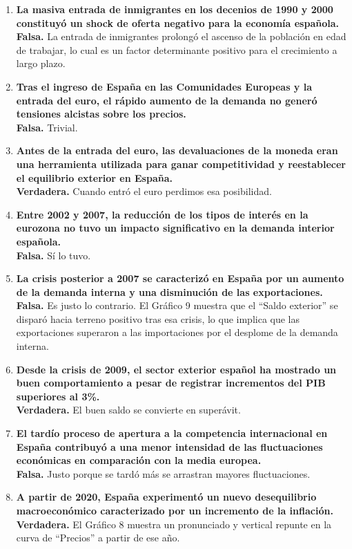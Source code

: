 \begin{enumerate}[label=\arabic*., resume=preguntas]
    \item \textbf{La masiva entrada de inmigrantes en los decenios de 1990 y 2000 constituyó un shock de oferta negativo para la economía española.} \\
    \textbf{Falsa.} La entrada de inmigrantes prolongó el ascenso de la población en edad de trabajar, lo cual es un factor determinante positivo para el crecimiento a largo plazo.

    \item \textbf{Tras el ingreso de España en las Comunidades Europeas y la entrada del euro, el rápido aumento de la demanda no generó tensiones alcistas sobre los precios.} \\
    \textbf{Falsa.} Trivial.

    \item \textbf{Antes de la entrada del euro, las devaluaciones de la moneda eran una herramienta utilizada para ganar competitividad y reestablecer el equilibrio exterior en España.} \\
    \textbf{Verdadera.} Cuando entró el euro perdimos esa posibilidad.

    \item \textbf{Entre 2002 y 2007, la reducción de los tipos de interés en la eurozona no tuvo un impacto significativo en la demanda interior española.} \\
    \textbf{Falsa.} Sí lo tuvo.

    \item \textbf{La crisis posterior a 2007 se caracterizó en España por un aumento de la demanda interna y una disminución de las exportaciones.} \\
    \textbf{Falsa.} Es justo lo contrario. El Gráfico 9 muestra que el ``Saldo exterior'' se disparó hacia terreno positivo tras esa crisis, lo que implica que las exportaciones superaron a las importaciones por el desplome de la demanda interna.

    \item \textbf{Desde la crisis de 2009, el sector exterior español ha mostrado un buen comportamiento a pesar de registrar incrementos del PIB superiores al 3\%.} \\
    \textbf{Verdadera.} El buen saldo se convierte en superávit.

    \item \textbf{El tardío proceso de apertura a la competencia internacional en España contribuyó a una menor intensidad de las fluctuaciones económicas en comparación con la media europea.} \\
    \textbf{Falsa.} Justo porque se tardó más se arrastran mayores fluctuaciones.

    \item \textbf{A partir de 2020, España experimentó un nuevo desequilibrio macroeconómico caracterizado por un incremento de la inflación.} \\
    \textbf{Verdadera.} El Gráfico 8 muestra un pronunciado y vertical repunte en la curva de ``Precios'' a partir de ese año.

\end{enumerate}

